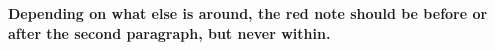 \documentclass{memoir}
\begin{document}
 \textbf{Depending on what else is around, the red note should be before or after the second paragraph, but never within.}

 \lipsum[1]
 \blockmargin
 \lipsum[1]
 \unblockmargin
 \lipsum[1]
 \marginpar{\scriptsize\lipsum[2]}
 \marginpar{\color{red}\lipsum[2]}
 \lipsum[1]
\end{document}
